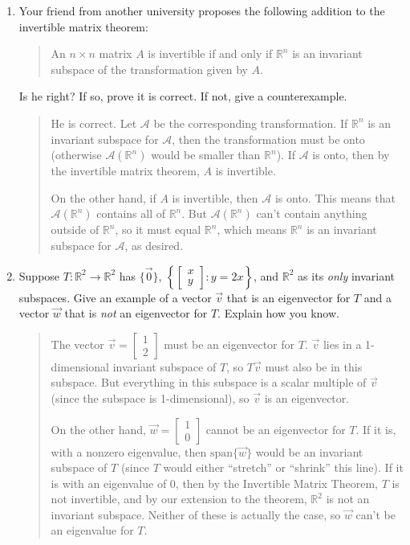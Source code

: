 \documentclass[letter]{article}
\newcommand{\R}{\mathbb{R}}
\newcommand{\Span}{\mathrm{span}}
\newcommand{\mat}[1]{\begin{bmatrix}#1\end{bmatrix}}
\begin{document}
\begin{enumerate}
\begin{enumerate}
\begin{quote}
			       \end{quote}
			\item Your friend from another university proposes the following addition to the invertible matrix theorem:
				\begin{quote}
					An $n\times n$ matrix $A$ is invertible if and only if $\R^n$ is an invariant subspace of the transformation
					given by $A$.
				\end{quote}
				Is he right?  If so, prove it is correct.  If not, give a counterexample.
				
				\begin{quote}
					He is correct.  Let $\mathcal{A}$ be the corresponding transformation.  If $\R^n$ is an invariant subspace for $\mathcal{A}$, then the transformation must be onto (otherwise $\mathcal{A}(\R^n)$ would be smaller than $\R^n$).  If $\mathcal{A}$ is onto, then by the invertible matrix theorem, $A$ is invertible.
					
					On the other hand, if $A$ is invertible, then $\mathcal{A}$ is onto.  This means that $\mathcal{A}(\R^n)$ contains all of $\R^n$.  But $\mathcal{A}(\R^n)$ can't contain anything outside of $\R^n$, so it must equal $\R^n$, which means $\R^n$ is an invariant subspace for $\mathcal{A}$, as desired.
				\end{quote}
				
			\item Suppose $T:\R^2\to\R^2$ has $\{\vec 0\}$, $\left\{\mat{x\\y}:y=2x\right\}$, and $\R^2$ as its \emph{only}
				invariant subspaces.  Give an example of a vector $\vec v$ that is an eigenvector for $T$ and a vector $\vec w$
				that is \emph{not} an eigenvector for $T$.  Explain how you know.
				
				\begin{quote}
					The vector $\vec{v} = \mat{1\\2}$ must be an eigenvector for $T$.  $\vec{v}$ lies in a 1-dimensional invariant subspace of $T$, so $T \vec{v}$ must also be in this subspace.  But everything in this subspace is a scalar multiple of $\vec{v}$ (since the subspace is 1-dimensional), so $\vec{v}$ is an eigenvector.
					
					On the other hand, $\vec{w} = \mat{1\\0}$ cannot be an eigenvector for $T$.  If it is, with a nonzero eigenvalue, then $\Span \{\vec{w}\}$ would be an invariant subspace of $T$ (since $T$ would either ``stretch'' or ``shrink'' this line).  If it is with an eigenvalue of 0, then by the Invertible Matrix Theorem, $T$ is not invertible, and by our extension to the theorem, $\R^2$ is not an invariant subspace.  Neither of these is actually the case, so $\vec{w}$ can't be an eigenvalue for $T$.
				\end{quote}
		\end{enumerate}
		
		
	\end{enumerate}
\end{document}
